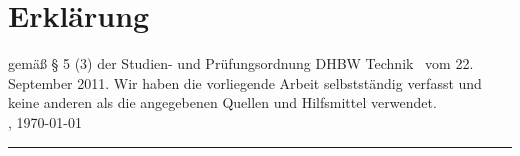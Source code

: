 \chapter*{Erklärung}
gemäß § 5 (3) der \glqq Studien- und Prüfungsordnung DHBW Technik\grqq~ vom 22. September 2011.
Wir haben die vorliegende Arbeit selbstständig verfasst und keine anderen als die angegebenen Quellen und Hilfsmittel verwendet.\\

\location, \today \\[4ex]
\rule[-0.2cm]{5cm}{0.5pt} \\
\textsc{\autor} \\[10ex]


%
%
%














